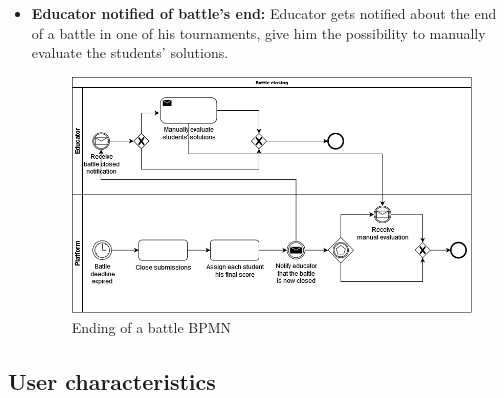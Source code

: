 \documentclass{article}
\begin{document}
{\begin{itemize}
            \item \textbf{Educator notified of battle's end:} Educator gets notified about the end of a battle in one of his tournaments, give him the possibility to manually evaluate the students' solutions.
            \begin{figure}[H]
                \centering
                \includegraphics[scale=0.4]{images/BPMN/BattleClosing.png}
                \caption{Ending of a battle BPMN}
                \label{fig:battleEndingBPMN}
            \end{figure}
        \end{itemize}
\subsection{User characteristics}
}
\end{document}
